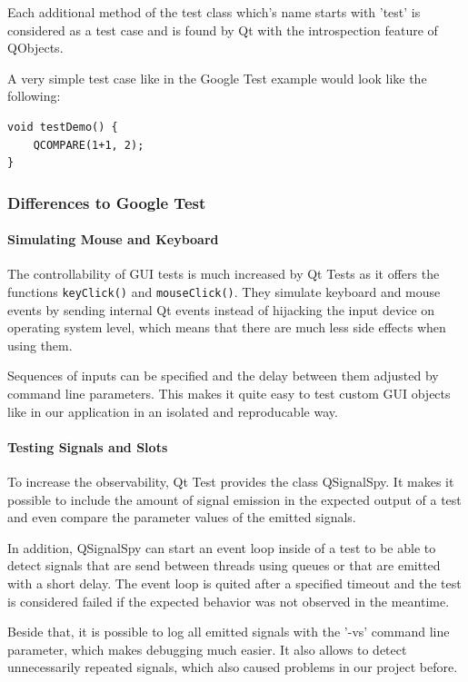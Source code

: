 \documentclass{scrreprt}
\begin{document}
Each additional method of the test class which's name starts with 'test' is considered as a test case and is found by Qt with the introspection feature of QObjects.

A very simple test case like in the Google Test example would look like the following:

\begin{lstlisting}[title=tests-qt/Demo.cpp]
void testDemo() {
	QCOMPARE(1+1, 2);
}
\end{lstlisting}

\subsubsection{Differences to Google Test}

\paragraph{Simulating Mouse and Keyboard}

The controllability of GUI tests is much increased by Qt Tests as it offers the functions \texttt{keyClick()} and \texttt{mouseClick()}. They simulate keyboard and mouse events by sending internal Qt events instead of hijacking the input device on operating system level, which means that there are much less side effects when using them. 

Sequences of inputs can be specified and the delay between them adjusted by command line parameters. This makes it quite easy to test custom GUI objects like in our application in an isolated and reproducable way.

\paragraph{Testing Signals and Slots}

To increase the observability, Qt Test provides the class QSignalSpy. It makes it possible to include the amount of signal emission in the expected output of a test and even compare the parameter values of the emitted signals.

In addition, QSignalSpy can start an event loop inside of a test to be able to detect signals that are send between threads using queues or that are emitted with a short delay. The event loop is quited after a specified timeout and the test is considered failed if the expected behavior was not observed in the meantime.

Beside that, it is possible to log all emitted signals with the '-vs' command line parameter, which makes debugging much easier. It also allows to detect unnecessarily repeated signals, which also caused problems in our project before.
\end{document}
